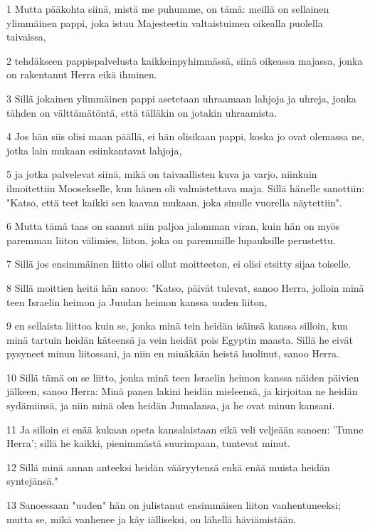 \par 1 Mutta pääkohta siinä, mistä me puhumme, on tämä: meillä on sellainen ylimmäinen pappi, joka istuu Majesteetin valtaistuimen oikealla puolella taivaissa,
\par 2 tehdäkseen pappispalvelusta kaikkeinpyhimmässä, siinä oikeassa majassa, jonka on rakentanut Herra eikä ihminen.
\par 3 Sillä jokainen ylimmäinen pappi asetetaan uhraamaan lahjoja ja uhreja, jonka tähden on välttämätöntä, että tälläkin on jotakin uhraamista.
\par 4 Jos hän siis olisi maan päällä, ei hän olisikaan pappi, koska jo ovat olemassa ne, jotka lain mukaan esiinkantavat lahjoja,
\par 5 ja jotka palvelevat siinä, mikä on taivaallisten kuva ja varjo, niinkuin ilmoitettiin Moosekselle, kun hänen oli valmistettava maja. Sillä hänelle sanottiin: "Katso, että teet kaikki sen kaavan mukaan, joka sinulle vuorella näytettiin".
\par 6 Mutta tämä taas on saanut niin paljoa jalomman viran, kuin hän on myös paremman liiton välimies, liiton, joka on paremmille lupauksille perustettu.
\par 7 Sillä jos ensimmäinen liitto olisi ollut moitteeton, ei olisi etsitty sijaa toiselle.
\par 8 Sillä moittien heitä hän sanoo: "Katso, päivät tulevat, sanoo Herra, jolloin minä teen Israelin heimon ja Juudan heimon kanssa uuden liiton,
\par 9 en sellaista liittoa kuin se, jonka minä tein heidän isäinsä kanssa silloin, kun minä tartuin heidän käteensä ja vein heidät pois Egyptin maasta. Sillä he eivät pysyneet minun liitossani, ja niin en minäkään heistä huolinut, sanoo Herra.
\par 10 Sillä tämä on se liitto, jonka minä teen Israelin heimon kanssa näiden päivien jälkeen, sanoo Herra: Minä panen lakini heidän mieleensä, ja kirjoitan ne heidän sydämiinsä, ja niin minä olen heidän Jumalansa, ja he ovat minun kansani.
\par 11 Ja silloin ei enää kukaan opeta kansalaistaan eikä veli veljeään sanoen: 'Tunne Herra'; sillä he kaikki, pienimmästä suurimpaan, tuntevat minut.
\par 12 Sillä minä annan anteeksi heidän vääryytensä enkä enää muista heidän syntejänsä."
\par 13 Sanoessaan "uuden" hän on julistanut ensimmäisen liiton vanhentuneeksi; mutta se, mikä vanhenee ja käy iälliseksi, on lähellä häviämistään.

